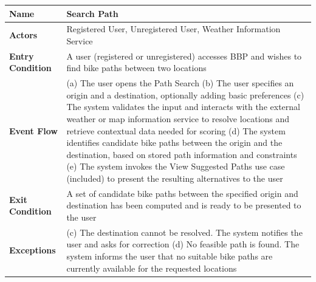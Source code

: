 \begin{table}[H]
\centering
\begin{tabular}{|p{4cm}|p{10cm}|}
\hline
\textbf{Name} & Search Path \\ \hline
\textbf{Actors} & Registered User, Unregistered User, Weather Information Service \\ \hline
\textbf{Entry Condition} & A user (registered or unregistered) accesses BBP and wishes to find bike paths between two locations \\ \hline
\textbf{Event Flow} &
(a) The user opens the Path Search \newline
(b) The user specifies an origin and a destination, optionally adding basic preferences \newline
(c) The system validates the input and interacts with the external weather or map information service to resolve locations and retrieve contextual data needed for scoring \newline
(d) The system identifies candidate bike paths between the origin and the destination, based on stored path information and constraints \newline
(e) The system invokes the View Suggested Paths use case (included) to present the resulting alternatives to the user \\ \hline
\textbf{Exit Condition} & A set of candidate bike paths between the specified origin and destination has been computed and is ready to be presented to the user \\ \hline
\textbf{Exceptions} &
(c) The destination cannot be resolved. The system notifies the user and asks for correction \newline
(d) No feasible path is found. The system informs the user that no suitable bike paths are currently available for the requested locations \\ \hline
\end{tabular}
\end{table}


